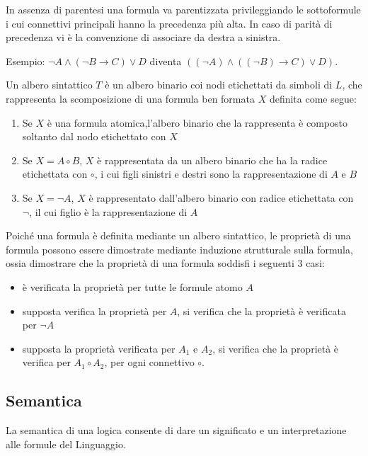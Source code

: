 \documentclass[a4paper,12pt, oneside]{book}
\begin{document}
In assenza di parentesi una formula va parentizzata privileggiando le
sottoformule 
i cui connettivi principali hanno la precedenza più alta.\newline
In caso di parità di precedenza vi è la convenzione di associare da destra a
sinistra. 

Esempio:\newline
$\neg A \land (\neg B \rightarrow C) \lor D$ diventa
$((\neg A) \land ((\neg B) \rightarrow C) \lor D)$.

\begin{definizione}
  Un albero sintattico $T$ è un albero binario coi nodi etichettati da simboli
  di $L$, che rappresenta la scomposizione di una formula ben formata $X$
  definita 
  come segue: 
\end{definizione}
\begin{enumerate}
  \item Se $X$ è una formula atomica,l'albero binario che la rappresenta è
  composto 
  soltanto dal nodo etichettato con $X$
  \item Se $X = A \circ B$, $X$ è rappresentata da un albero binario che ha la
  radice 
  etichettata con $\circ$, i cui figli sinistri e destri sono la
  rappresentazione di $A$ e $B$ 
  \item Se $X = \neg A$, $X$ è rappresentato dall'albero binario con radice
  etichettata 
  con $\neg$, il cui figlio è la rappresentazione di $A$
\end{enumerate}

Poiché una formula è definita mediante un albero sintattico, le proprietà di una
formula 
possono essere dimostrate mediante induzione strutturale sulla formula, ossia
dimostrare 
che la proprietà di una formula soddisfi i seguenti 3 casi:
\begin{itemize}
  \item è verificata la proprietà per tutte le formule atomo $A$
  \item supposta verifica la proprietà per $A$, si verifica che la proprietà è
  verificata per $\neg A$ 
  \item supposta la proprietà verificata per $A_1$ e $A_2$, si verifica che la
  proprietà è verifica per $A_1 \circ A_2$, per ogni connettivo $\circ$.
\end{itemize}
\newpage
\subsection{Semantica}
La semantica di una logica consente di dare un significato e un interpretazione
alle formule del Linguaggio.\newline
\end{document}

